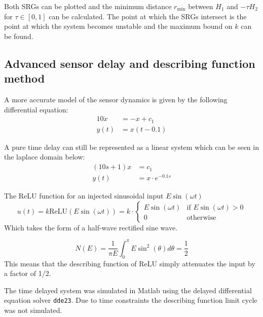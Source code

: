 \documentclass{article}
\begin{document}
Both SRGs can be plotted and the minimum distance $r_\text{min}$ between $H_1$ and $-\tau H_2 $ for $\tau \in [0,1]$ can be calculated.
The point at which the SRGs intersect is the point at which the system becomes unstable and the maximum bound on $k$ can be found.


\subsection{Advanced sensor delay and describing function method}

A more accurate model of the sensor dynamics is given by the following differential equation:
\begin{align}
    10\dot{x} &= -x + c_1 \\
    y(t) &= x(t-0.1)
\end{align}

A pure time delay can still be represented as a linear system which can be seen in the laplace domain below:
\begin{align}
    (10s + 1)x &= c_1 \\
    y(t) &= x \cdot e^{-0.1s}
\end{align}

The ReLU function for an injected sinusoidal input $E\sin(\omega t)$ 
\begin{equation}
    u(t) = k \text{ReLU}(E\sin(\omega t)) = k \cdot \begin{cases}
        E\sin(\omega t) & \text{if } E\sin(\omega t) > 0 \\
        0 & \text{otherwise}
        \end{cases}
\end{equation}
Which takes the form of a half-wave rectified sine wave.

\begin{equation}
    N(E) = \frac{1}{\pi E} \int_0^\pi E \sin^2(\theta) d\theta = \frac{1}{2}
\end{equation}
This means that the describing function of ReLU simply attenuates the input by a factor of 1/2.

The time delayed system was simulated in Matlab using the delayed differential equation solver \texttt{dde23}.
Due to time constraints the describing function limit cycle was not simulated.
\end{document}
